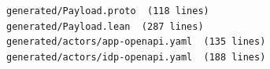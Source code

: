 \begin{lstlisting}[language={},basicstyle=\ttfamily\scriptsize,breaklines=true]
generated/Payload.proto  (118 lines)
generated/Payload.lean  (287 lines)
generated/actors/app-openapi.yaml  (135 lines)
generated/actors/idp-openapi.yaml  (188 lines)
\end{lstlisting}
